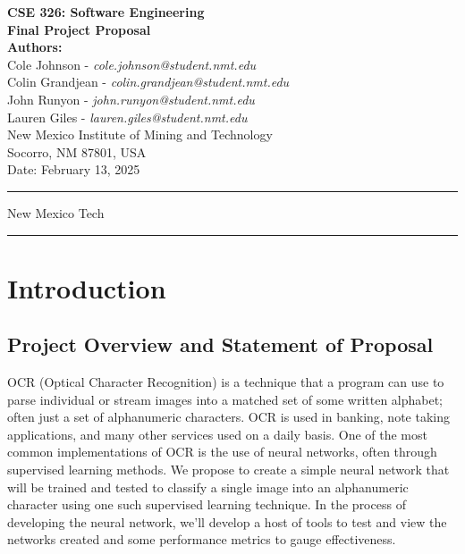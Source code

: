 \documentclass[english,12pt]{article}
\begin{document}
\begin{titlepage}
    \null
    \vspace*{2cm}
    
    \begin{center}
        {\Huge \bfseries CSE 326: Software Engineering}\\[1.5cm]
        {\Large \bfseries Final Project Proposal}\\[2cm]
        
        \textbf{Authors:} \\[0.5cm]
        Cole Johnson - \textit{cole.johnson@student.nmt.edu}\\
        Colin Grandjean - \textit{colin.grandjean@student.nmt.edu}\\
        John Runyon - \textit{john.runyon@student.nmt.edu}\\
        Lauren Giles - \textit{lauren.giles@student.nmt.edu}\\[1cm]
        
        New Mexico Institute of Mining and Technology\\
        Socorro, NM 87801, USA\\[2cm]
        
        {\large Date: February 13, 2025}
    \end{center}
    
    \vfill
    \hrule
    \smallskip
    \centerline{\sc New Mexico Tech}
    \smallskip
    \hrule
\end{titlepage}

{\tableofcontents} 
\pagebreak
\section{Introduction}

\subsection{Project Overview and Statement of Proposal}
OCR (Optical Character Recognition) is a technique that a program can use to 
parse individual or stream images into a matched set of some written alphabet; 
often just a set of alphanumeric characters. 
OCR is used in banking, note taking applications,
 and many other services used on a daily basis. 
One of the most common implementations of OCR is the use of neural networks, 
often through supervised learning methods. 
We propose to create a simple neural network that will be trained and tested 
to classify a single image into an alphanumeric character 
using one such supervised learning technique. 
In the process of developing the neural network, 
we'll develop a host of tools to test and 
view the networks created and some performance metrics to gauge effectiveness.
\end{document}
